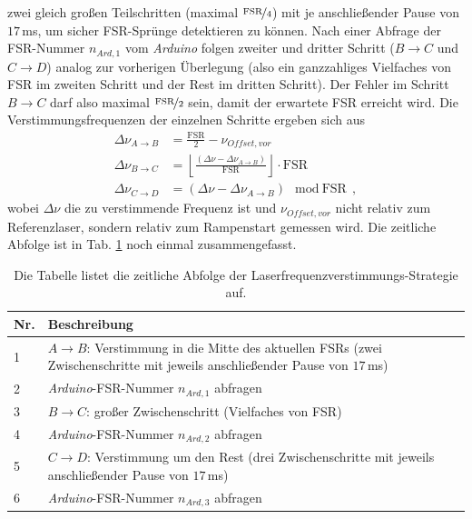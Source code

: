 zwei gleich großen Teilschritten (maximal $\nicefrac{\text{FSR}}{4}$) mit je
anschließender Pause von $17\,$ms, um sicher FSR-Sprünge detektieren zu können.
Nach einer Abfrage der FSR-Nummer $n_{Ard,1}$ vom \textit{Arduino} folgen zweiter und dritter Schritt ($B\rightarrow C$ und $C\rightarrow D$) analog zur
vorherigen Überlegung (also ein ganzzahliges Vielfaches von FSR im zweiten
Schritt und der Rest im dritten Schritt). Der Fehler im Schritt $B\rightarrow C$
darf also maximal $\nicefrac{\text{FSR}}{2}$ sein, damit der erwartete FSR erreicht wird. Die Verstimmungsfrequenzen der einzelnen Schritte ergeben sich aus
\begin{equation}\label{eq:scan-strategie_schritte}
	\begin{split}
		\Delta\nu_{A\rightarrow B}&=\frac{\text{FSR}}{2}-\nu_{Offset,vor}\\
		\Delta\nu_{B\rightarrow
		C}&=\left\lfloor\frac{(\Delta\nu-\Delta\nu_{A\rightarrow
		B})}{\text{FSR}}\right\rfloor\cdot\text{FSR}\\
		\Delta\nu_{C\rightarrow D}&=(\Delta\nu-\Delta\nu_{A\rightarrow
		B})\mod\text{FSR}\,,
	\end{split}
\end{equation}
wobei $\Delta\nu$ die zu verstimmende Frequenz ist und $\nu_{Offset,vor}$ nicht
relativ zum Referenzlaser, sondern relativ zum Rampenstart gemessen wird. Die
zeitliche Abfolge ist in Tab.
\ref{tab:scan-strategie_abfolge} noch einmal zusammengefasst.
\begin{table}
	\begin{tabular}{p{}p{}}
		\toprule
			Nr. & Beschreibung \\
		\midrule[1px]
		\hline
			1 & $A\rightarrow B$: Verstimmung in die Mitte des aktuellen FSRs (zwei
			Zwischenschritte mit jeweils anschließender Pause von $17\,$ms)\\
			2 & \textit{Arduino}-FSR-Nummer $n_{Ard,1}$ abfragen\\
			3 & $B\rightarrow C$: großer Zwischenschritt (Vielfaches von FSR)\\
			4 & \textit{Arduino}-FSR-Nummer $n_{Ard,2}$ abfragen\\
			5 & $C\rightarrow D$: Verstimmung um den Rest (drei Zwischenschritte mit
			jeweils anschließender Pause von $17\,$ms)\\
			6 & \textit{Arduino}-FSR-Nummer $n_{Ard,3}$ abfragen\\
		\bottomrule[1px]
	\end{tabular}
	\caption[Laserfrequenzverstimmungs-Strategie]{Die Tabelle listet die zeitliche
	Abfolge der Laserfrequenzverstimmungs-Strategie auf.}
	\label{tab:scan-strategie_abfolge}
\end{table}
